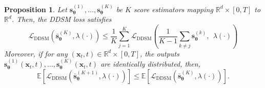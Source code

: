 \documentclass[10pt,a4paper]{amsart}
\newtheorem{proposition}{Proposition}
\newcommand{\DDSM}{\text{DDSM}}
\newcommand{\R}{\mathbb{R}}
\def\rvx{{\mathbf{x}}}
\def\vs{{\bm{s}}}
\def\vtheta{{\bm{\theta}}}
\begin{document}
\begin{proposition}\label{proposition: ensemble monotonicity score loss}
Let $\vs^{(1)}_\vtheta,\dots,\vs^{(K)}_\vtheta$ be $K$ score estimators mapping $\R^d \times [0,T]$ to $\R^d$. Then, the DDSM loss satisfies
\begin{equation}
\mathcal{L}_\DDSM(\overline{\vs}_\vtheta^{(K)},\lambda(\cdot)) \leq \frac{1}{K} \sum_{j=1}^K \mathcal{L}_\DDSM\left(\frac{1}{K-1} \sum_{k \neq j} \vs_\vtheta^{(k)},\:\:\lambda(\cdot)\right)
\end{equation}
Moreover, if for any $(\rvx_t,t) \in \R^d \times [0,T]$, the outputs $\vs^{(1)}_\vtheta(\rvx_t,t), \dots, \vs_\vtheta^{(K)}(\rvx_t,t) $ are identically distributed, then, 
\begin{equation}
\mathbb{E} \left[\mathcal{L}_{\DDSM}(\overline{\vs}_\vtheta^{(K+1)},\lambda(\cdot)) \right] \leq \mathbb{E}\left[\mathcal{L}_{\DDSM}(\overline{\vs}_\vtheta^{(K)},\lambda(\cdot)) \right].
\end{equation}
\end{proposition}
\end{document}
